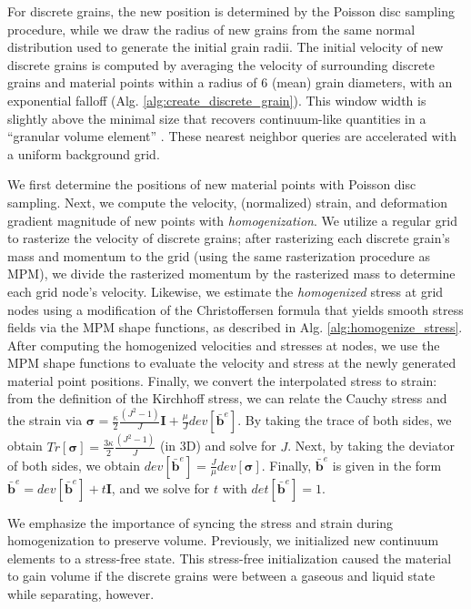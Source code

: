 For discrete grains, the new
position is determined by the Poisson disc sampling procedure, while we draw the radius of new grains from the same
normal distribution used to generate the initial grain radii. The initial velocity of new discrete grains is computed by
averaging the velocity of surrounding discrete grains and material points within a radius of $6$ (mean) grain diameters, with an exponential
falloff (Alg. \ref{alg:create_discrete_grain}). This window width is slightly above the minimal size that recovers
continuum-like quantities in a ``granular volume element'' \cite{Rycroft:2009}. These nearest neighbor queries are
accelerated with a uniform background grid. 

We first determine the positions of new material points with Poisson disc sampling. Next, we compute the velocity,
(normalized) strain, and deformation gradient magnitude of new points with \textit{homogenization}.
We utilize a regular grid to rasterize the velocity of discrete grains; after rasterizing each discrete grain's mass and
momentum to the grid (using the same rasterization procedure as MPM), we divide the rasterized momentum by the rasterized
mass to determine each grid node's velocity. Likewise, we estimate the \textit{homogenized} stress at grid nodes using
a modification of the Christoffersen formula \cite{Christoffersen:1981:Micromechanical} that yields smooth stress 
fields via the MPM shape functions, as described in Alg. \ref{alg:homogenize_stress}.
After computing the homogenized velocities and stresses at nodes, we use the MPM shape functions to evaluate
the velocity and stress at the newly generated material point positions. Finally, we convert the interpolated stress to
strain: from the definition of the Kirchhoff stress, we can relate the Cauchy stress and the strain via
$\bm{\sigma} = \frac{\kappa}{2} \frac{\left( J^2 - 1 \right)}{J} \boldsymbol{I} + \frac{\mu}{J} dev[\bar{\boldsymbol{b}}^e]$.
By taking the trace of both sides, we obtain $Tr[ \bm{\sigma} ] = \frac{3 \kappa}{2} \frac{\left( J^2 - 1 \right)}{J}$ (in 3D)
and solve for $J$. Next, by taking the deviator of both sides, we obtain $dev[\bar{\boldsymbol{b}}^e] = \frac{J}{\mu} dev[\bm{\sigma}]$.
Finally, $\bar{\boldsymbol{b}}^e$ is given in the form $\bar{\boldsymbol{b}}^e = dev[\bar{\boldsymbol{b}}^e] + t \boldsymbol{I}$,
and we solve for $t$ with $det[\bar{\boldsymbol{b}}^e] = 1$.

We emphasize the importance of syncing the stress and strain during homogenization to
preserve volume. Previously, we initialized new continuum elements to a stress-free state.
This stress-free initialization caused the material to gain volume if the discrete grains were between a gaseous
and liquid state while separating, however.

